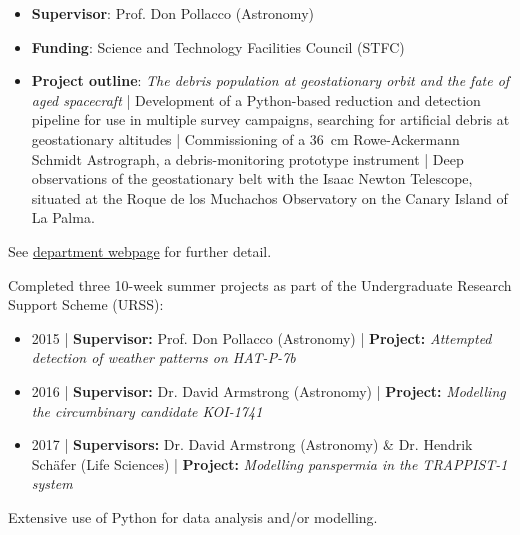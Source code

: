 \documentclass[10pt,a4paper]{altacv}
\begin{document}

\begin{fullwidth}
\makecvheader
\end{fullwidth}



\begin{itemize}
\item \textbf{Supervisor}: Prof. Don Pollacco (Astronomy)
\item \textbf{Funding}: Science and Technology Facilities Council (STFC)
\item \justify \textbf{Project outline}: \textit{The debris population at geostationary orbit and the fate of aged spacecraft} |
Development of a Python-based reduction and detection pipeline for use in multiple survey campaigns, searching for artificial debris at geostationary altitudes |
Commissioning of a 36~cm Rowe-Ackermann Schmidt Astrograph, a debris-monitoring prototype instrument |
Deep observations of the geostationary belt with the Isaac Newton Telescope, situated at the Roque de los Muchachos Observatory on the Canary Island of La Palma.
\end{itemize}
\small See \href{https://warwick.ac.uk/fac/sci/physics/research/astro/people/jamesblake/}{department webpage} for further detail.

\divider

\vspace{-1em}
\small \justify Completed three 10-week summer projects as part of the Undergraduate Research Support Scheme (URSS):
\begin{itemize}
\item 2015 | \textbf{Supervisor:} Prof. Don Pollacco (Astronomy) | \textbf{Project:} \textit{Attempted detection of weather patterns on HAT-P-7b}
\item 2016 | \textbf{Supervisor:} Dr. David Armstrong (Astronomy) | \textbf{Project:} \textit{Modelling the circumbinary candidate KOI-1741}
\item 2017 | \textbf{Supervisors:} Dr. David Armstrong (Astronomy) \& Dr. Hendrik Sch{\"a}fer (Life Sciences) | \textbf{Project:} \textit{Modelling panspermia in the TRAPPIST-1 system}
\end{itemize}
Extensive use of Python for data analysis and/or modelling.
\end{document}
